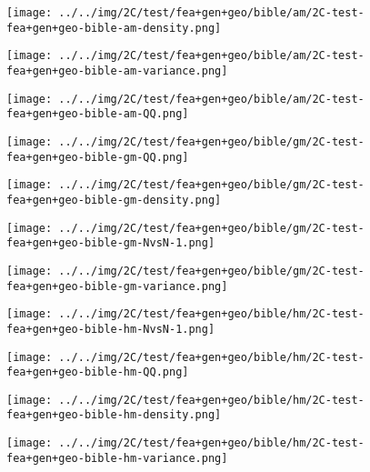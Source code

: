 \begin{figure}[H]
\centering	\texttt{[image: ../../img/2C/test/fea+gen+geo/bible/am/2C-test-fea+gen+geo-bible-am-density.png]}
\end{figure}
\begin{figure}[H]
\centering	\texttt{[image: ../../img/2C/test/fea+gen+geo/bible/am/2C-test-fea+gen+geo-bible-am-variance.png]}
\end{figure}
\begin{figure}[H]
\centering	\texttt{[image: ../../img/2C/test/fea+gen+geo/bible/am/2C-test-fea+gen+geo-bible-am-QQ.png]}
\end{figure}
\begin{figure}[H]
\centering	\texttt{[image: ../../img/2C/test/fea+gen+geo/bible/gm/2C-test-fea+gen+geo-bible-gm-QQ.png]}
\end{figure}
\begin{figure}[H]
\centering	\texttt{[image: ../../img/2C/test/fea+gen+geo/bible/gm/2C-test-fea+gen+geo-bible-gm-density.png]}
\end{figure}
\begin{figure}[H]
\centering	\texttt{[image: ../../img/2C/test/fea+gen+geo/bible/gm/2C-test-fea+gen+geo-bible-gm-NvsN-1.png]}
\end{figure}
\begin{figure}[H]
\centering	\texttt{[image: ../../img/2C/test/fea+gen+geo/bible/gm/2C-test-fea+gen+geo-bible-gm-variance.png]}
\end{figure}
\begin{figure}[H]
\centering	\texttt{[image: ../../img/2C/test/fea+gen+geo/bible/hm/2C-test-fea+gen+geo-bible-hm-NvsN-1.png]}
\end{figure}
\begin{figure}[H]
\centering	\texttt{[image: ../../img/2C/test/fea+gen+geo/bible/hm/2C-test-fea+gen+geo-bible-hm-QQ.png]}
\end{figure}
\begin{figure}[H]
\centering	\texttt{[image: ../../img/2C/test/fea+gen+geo/bible/hm/2C-test-fea+gen+geo-bible-hm-density.png]}
\end{figure}
\begin{figure}[H]
\centering	\texttt{[image: ../../img/2C/test/fea+gen+geo/bible/hm/2C-test-fea+gen+geo-bible-hm-variance.png]}
\end{figure}
